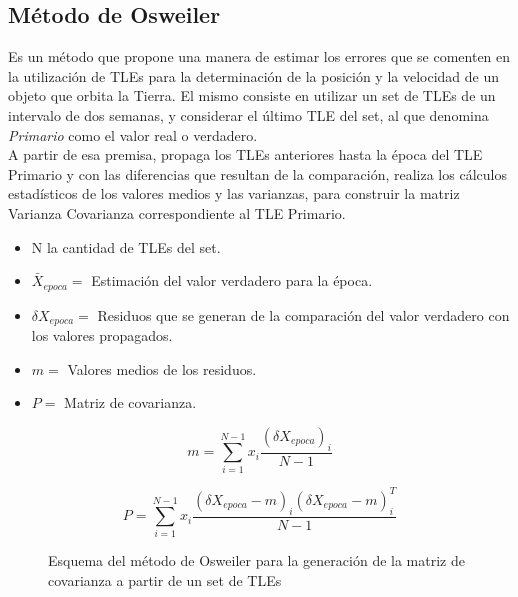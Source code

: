 \subsection{M\'etodo de Osweiler}\label{subsec:osw}
Es un m\'etodo que propone una manera de estimar los errores que se comenten en la utilizaci\'on de TLEs para la determinaci\'on de la posici\'on y la velocidad de un objeto que orbita la Tierra.
El mismo consiste en utilizar un set de TLEs de un intervalo de dos semanas, y considerar el \'ultimo TLE del set, al que denomina {\it{Primario}} como el valor real o verdadero.\\
A partir de esa premisa, propaga los TLEs anteriores hasta la \'epoca del TLE Primario y con las diferencias que resultan de la comparaci\'on, realiza los c\'alculos estad\'isticos de los valores medios y las varianzas, para construir la matriz Varianza Covarianza correspondiente al TLE Primario.\\

\begin{itemize}
\itemsep0em
 \item N la cantidad de TLEs del set.
 \item $\bar{X}_{epoca} = $  Estimaci\'on del valor verdadero para la \'epoca.
 \item $\delta X_{epoca} = $ Residuos que se generan de la comparaci\'on del valor verdadero con los valores propagados.
 \item $m = $ Valores medios de los residuos.
 \item $P = $ Matriz de covarianza.
\end{itemize}

\begin{equation}
 m=\sum_{i=1}^{N-1}x_{i} \frac{(\delta X_{epoca})_{i}}{N-1} 
\end{equation}


\begin{equation}
 P=\sum_{i=1}^{N-1}x_{i} \frac{(\delta X_{epoca}-m)_{i}(\delta X_{epoca}-m)_{i}^{T}}{N-1}
\end{equation}

\begin{figure}[!h]
\centering
{}
\caption[M\'etodo de Osweiler para la generaci\'on de la matriz de covarianza]{Esquema del m\'etodo de Osweiler para la generaci\'on de la matriz de covarianza a partir de un set de TLEs}
\label{fig:tleosw}
\end{figure}

